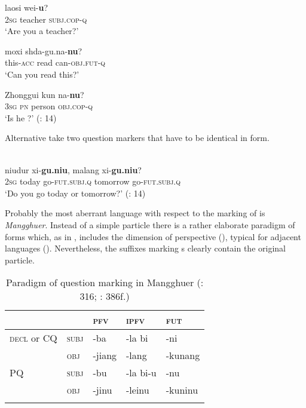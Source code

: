     \ex
     {laosi} {wei}-\textbf{{u}}?\\
    2\textsc{sg}  teacher  \textsc{subj}.\textsc{cop}-\textsc{q}\\
    \glt ‘Are you a teacher?’
    
    \ex
     {moxi} shda-gu.na-\textbf{{nu}}?\\
    this-\textsc{acc}  read  can-\textsc{obj}.\textsc{fut}-\textsc{q}\\
    \glt ‘Can you read this?’
    
    \ex
     {Zhonggui} {kun} {na-}\textbf{{nu}}?\\
    3\textsc{sg}  \textsc{pn}    person  \textsc{obj}.\textsc{cop}-\textsc{q}\\
    \glt ‘Is he ?’ (\citealt{Åkerman2012}: 14)
    \z
    \z 

Alternative  take two question markers that have to be identical in form.

\ea%
    \label{ex:mong:56}
    \\
     {niudur} {xi-}\textbf{{gu}}\textbf{.}\textbf{{niu}}, {malang} {xi-}\textbf{{gu}}\textbf{.}\textbf{{niu}}?\\
    2\textsc{sg}  today    go-\textsc{fut.subj.q}  tomorrow  go-\textsc{fut.subj.q}\\
    \glt ‘Do you go today or tomorrow?’ (\citealt{Åkerman2012}: 14)
    \z

Probably the most aberrant  language with respect to the marking of  is \textit{Mangghuer}. Instead of a simple particle there is a rather elaborate paradigm of forms which, as in , includes the dimension of perspective (), typical for adjacent  languages (). Nevertheless, the suffixes marking s clearly contain the original  particle.

\begin{table}
\caption{Paradigm of question marking in Mangghuer (\citealt{Slater2003b}: 316; \citealt{Dixon2012}: 386f.)}
\label{tab:mong:9}

\begin{tabularx}{\textwidth}{XXXXl}
\lsptoprule
&  & \textbf{\textsc{pfv}} & \textbf{\textsc{ipfv}} & \textbf{\textsc{fut}}\\
\midrule
\textsc{decl} or CQ & \textsc{subj} & -ba & -la bi & -ni\\
& \textsc{obj} & -jiang & -lang & -kunang\\
PQ & \textsc{subj} & -bu & -la bi-u & -nu\\
& \textsc{obj} & -jinu & -leinu & -kuninu\\
\lspbottomrule
\end{tabularx}
\end{table}

